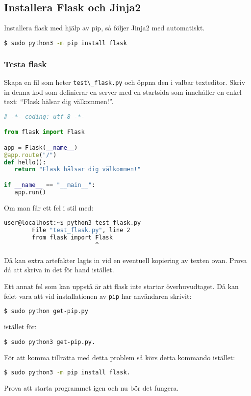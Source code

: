 \documentclass{TDP003mall}
\begin{document}
\subsection{Installera Flask och Jinja2}
Installera flask med hjälp av pip, så följer Jinja2 med automatiskt.
\begin{lstlisting}[language=bash]
 $ sudo python3 -m pip install flask
\end{lstlisting}

\pagebreak

\subsubsection{Testa flask}
Skapa en fil som heter \verb|test\_flask.py| och öppna den i valbar texteditor. Skriv in denna kod som definierar en server med en startsida som innehåller en enkel text: ``Flask hälsar dig välkommen!''.
\begin{lstlisting}[language=python]
# -*- coding: utf-8 -*-

from flask import Flask

app = Flask(__name__)
@app.route("/")
def hello():
   return "Flask hälsar dig välkommen!"

if __name__ == "__main__":
   app.run()
\end{lstlisting}


Om man får ett fel i stil med:
\begin{lstlisting}[language=bash]
	user@localhost:~$ python3 test_flask.py 
  		File "test_flask.py", line 2
    	from flask import Flask
                          ^
\end{lstlisting}
Då kan extra artefakter lagts in vid en eventuell kopiering av texten ovan. 
Prova då att skriva in det för hand istället.


Ett annat fel som kan uppstå är att flask inte startar överhuvudtaget. 
Då kan felet vara att vid installationen av \verb|pip| har användaren skrivit:
\begin{lstlisting}[language=bash]
 $ sudo python get-pip.py
\end{lstlisting}
istället för:
\begin{lstlisting}[language=bash]
 $ sudo python3 get-pip.py.
\end{lstlisting}
För att komma tillrätta med detta problem så körs detta kommando istället:
\begin{lstlisting}[language=bash]
 $ sudo python3 -m pip install flask.
\end{lstlisting}
Prova att starta programmet igen och nu bör det fungera.
\end{document}

